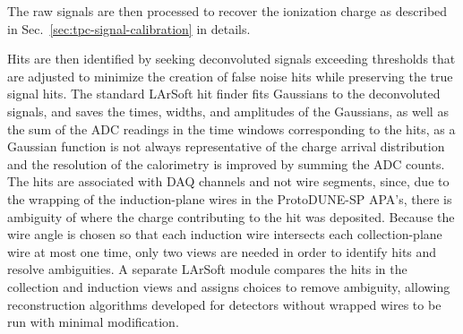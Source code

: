 The raw signals are then processed to recover the ionization charge
as described in Sec.~\ref{sec:tpc-signal-calibration} in details. 



Hits are then identified by seeking deconvoluted signals exceeding
thresholds that are adjusted to minimize the creation of false noise
hits while preserving the true signal hits.  The standard LArSoft hit
finder fits Gaussians to the deconvoluted signals, and saves the
times, widths, and amplitudes of the Gaussians, as well as the sum of
the ADC readings in the time windows corresponding to the hits, as a
Gaussian function is not always representative of the charge arrival
distribution and the resolution of the calorimetry is improved by
summing the ADC counts.  The hits are associated with DAQ channels and
not wire segments, since, due to the wrapping of the induction-plane
wires in the ProtoDUNE-SP APA's, there is ambiguity of where the
charge contributing to the hit was deposited.  Because the wire angle
is chosen so that each induction wire intersects each collection-plane
wire at most one time, only two views are needed in order to identify
hits and resolve ambiguities.  A separate LArSoft module compares the
hits in the collection and induction views and assigns choices to
remove ambiguity, allowing reconstruction algorithms developed for
detectors without wrapped wires to be run with minimal modification.

